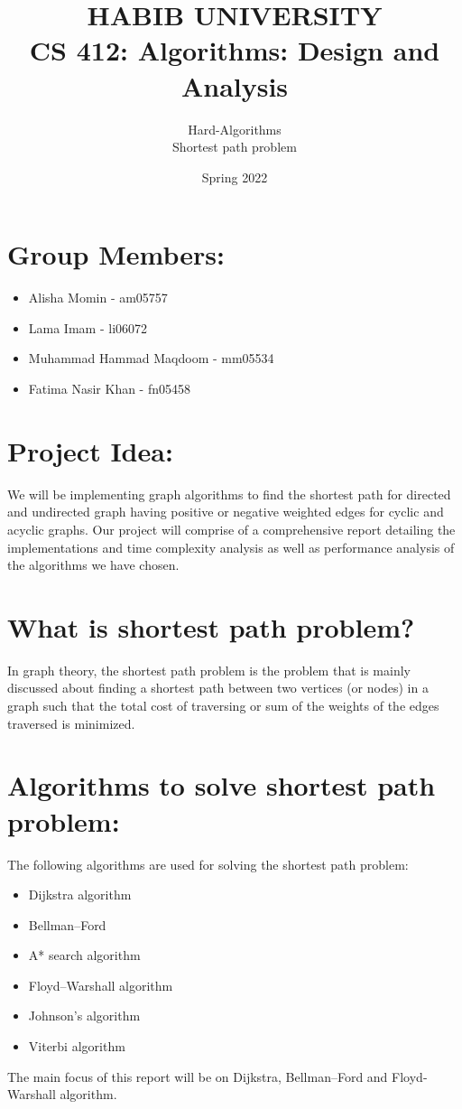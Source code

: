 \documentclass[a4paper]{article}
\title{\textbf{HABIB UNIVERSITY} \\
\textbf{CS 412: Algorithms: Design and Analysis}
}
\author{Hard-Algorithms \\ Shortest path problem}
\date{Spring 2022}
\begin{document}
\maketitle
\section{Group Members:}
\begin{itemize}
    \item Alisha Momin - am05757
    \item Lama Imam - li06072
    \item Muhammad Hammad Maqdoom - mm05534
    \item Fatima Nasir Khan - fn05458

\end{itemize}
\section{Project Idea:}
We will be implementing graph algorithms to find the shortest path for directed and undirected graph having positive or negative weighted edges for cyclic and acyclic graphs. Our project will comprise of a comprehensive report detailing the implementations and time complexity analysis as well as performance analysis of the algorithms we have chosen.

\section{What is shortest path problem?}
In graph theory, the shortest path problem is the problem that is mainly discussed about finding a shortest path between two vertices (or nodes) in a graph such that the total cost of traversing or sum of the weights of the edges traversed is minimized.
\section{Algorithms to solve shortest path problem:}
The following algorithms are used for solving the shortest path problem:
\begin{itemize}
\item Dijkstra algorithm
\item Bellman–Ford
\item A* search algorithm
\item Floyd–Warshall algorithm
\item Johnson’s algorithm
\item Viterbi algorithm
\end{itemize}
The main focus of this report will be on Dijkstra, Bellman–Ford and Floyd- Warshall algorithm.
\end{document}
